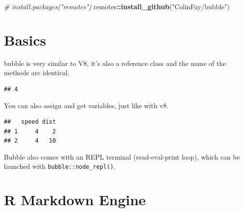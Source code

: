 \documentclass[
]{krantz}
\makeatletter
\newenvironment{Shaded}{\begin{snugshade}}{\end{snugshade}}
\newcommand{\CommentTok}[1]{\textcolor[rgb]{0.37,0.37,0.37}{\textit{#1}}}
\newcommand{\DecValTok}[1]{\textcolor[rgb]{0.06,0.06,0.06}{#1}}
\newcommand{\KeywordTok}[1]{\textcolor[rgb]{0.27,0.27,0.27}{\textbf{#1}}}
\newcommand{\NormalTok}[1]{#1}
\newcommand{\OperatorTok}[1]{\textcolor[rgb]{0.43,0.43,0.43}{\textbf{#1}}}
\newcommand{\StringTok}[1]{\textcolor[rgb]{0.5,0.5,0.5}{#1}}
\newenvironment{kframe}{%
\medskip{}
\setlength{\fboxsep}{.8em}
 \def\at@end@of@kframe{}%
 \ifinner\ifhmode%
  \def\at@end@of@kframe{\end{minipage}}%
  \begin{minipage}{\columnwidth}%
 \fi\fi%
 \def\FrameCommand##1{\hskip\@totalleftmargin \hskip-\fboxsep
 \colorbox{shadecolor}{##1}\hskip-\fboxsep
     \hskip-\linewidth \hskip-\@totalleftmargin \hskip\columnwidth}%
 \MakeFramed {\advance\hsize-\width
   \@totalleftmargin\z@ \linewidth\hsize
   \@setminipage}}%
 {\par\unskip\endMakeFramed%
 \at@end@of@kframe}
\renewenvironment{Shaded}{\begin{kframe}}{\end{kframe}}
\makeatother
\begin{document}
\begin{Shaded}
\begin{Highlighting}[]
\CommentTok{\# install.packages("remotes")}
\NormalTok{remotes}\OperatorTok{::}\KeywordTok{install\_github}\NormalTok{(}\StringTok{"ColinFay/bubble"}\NormalTok{)}
\end{Highlighting}
\end{Shaded}

\hypertarget{basics-1}{%
\section*{Basics}\label{basics-1}}


bubble is very similar to V8, it's also a reference class and the name of the methods are identical.

\begin{Shaded}
\end{Shaded}

\begin{verbatim}
## 4
\end{verbatim}

You can also assign and get variables, just like with v8.

\begin{Shaded}
\end{Shaded}

\begin{verbatim}
##   speed dist
## 1     4    2
## 2     4   10
\end{verbatim}

Bubble also comes with an REPL terminal (read-eval-print loop), which can be launched with \texttt{bubble::node\_repl()}.

\hypertarget{r-markdown-engine}{%
\section*{R Markdown Engine}\label{r-markdown-engine}}
\end{document}
